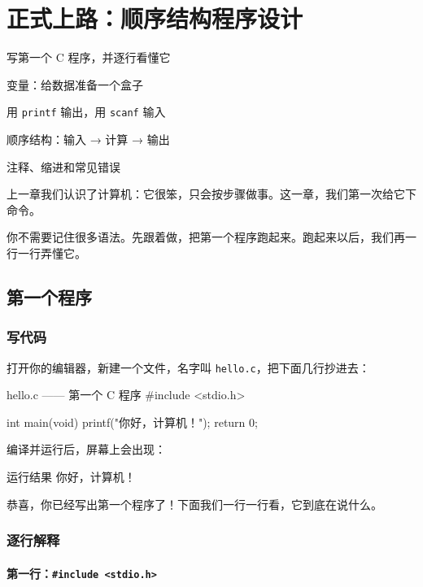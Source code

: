\chapter{正式上路：顺序结构程序设计}

\begin{introduction}
  \item 写第一个 C 程序，并逐行看懂它
  \item 变量：给数据准备一个盒子
  \item 用 \texttt{printf} 输出，用 \texttt{scanf} 输入
  \item 顺序结构：输入 → 计算 → 输出
  \item 注释、缩进和常见错误
\end{introduction}


上一章我们认识了计算机：它很笨，只会按步骤做事。这一章，我们第一次给它下命令。

你不需要记住很多语法。先跟着做，把第一个程序跑起来。跑起来以后，我们再一行一行弄懂它。

\section{第一个程序}

\subsection{写代码}

打开你的编辑器，新建一个文件，名字叫 \texttt{hello.c}，把下面几行抄进去：

\begin{codebox}{hello.c —— 第一个 C 程序}
#include <stdio.h>

int main(void)
{
    printf("你好，计算机！\n");
    return 0;
}
\end{codebox}

编译并运行后，屏幕上会出现：

\begin{outbox}{运行结果}
你好，计算机！
\end{outbox}

恭喜，你已经写出第一个程序了！下面我们一行一行看，它到底在说什么。

\subsection{逐行解释}

\subsubsection*{第一行：\texttt{\#include <stdio.h>}}


